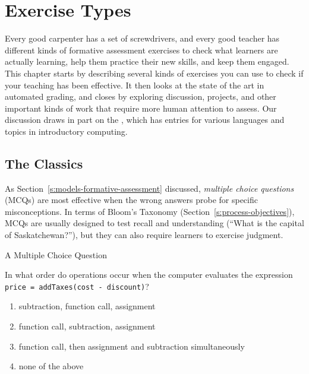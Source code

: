 \chapter{Exercise Types}\label{s:exercises}

Every good carpenter has a set of screwdrivers, and every good teacher
has different kinds of formative assessment exercises to check what
learners are actually learning, help them practice their new skills, and
keep them engaged. This chapter starts by describing several kinds of
exercises you can use to check if your teaching has been effective. It
then looks at the state of the art in automated grading, and closes by
exploring discussion, projects, and other important kinds of work that
require more human attention to assess. Our discussion draws in part on
the 
\cite{Sand2013}, which has entries for various languages and topics
in introductory computing.

\section{The Classics}\label{s:exercises-classics}

As Section~\ref{s:models-formative-assessment} discussed, \emph{multiple
choice questions} (MCQs) are most effective when the wrong answers probe
for specific misconceptions. In terms of Bloom's Taxonomy
(Section~\ref{s:process-objectives}), MCQs are usually designed to test
recall and understanding (``What is the capital of Saskatchewan?''), but
they can also require learners to exercise judgment.

\begin{aside}{A Multiple Choice Question}

In what order do operations occur when the computer evaluates the
expression \texttt{price\ =\ addTaxes(cost\ -\ discount)}?

\begin{enumerate}
\item
  subtraction, function call, assignment
\item
  function call, subtraction, assignment
\item
  function call, then assignment and subtraction simultaneously
\item
  none of the above
\end{enumerate}

\end{aside}

